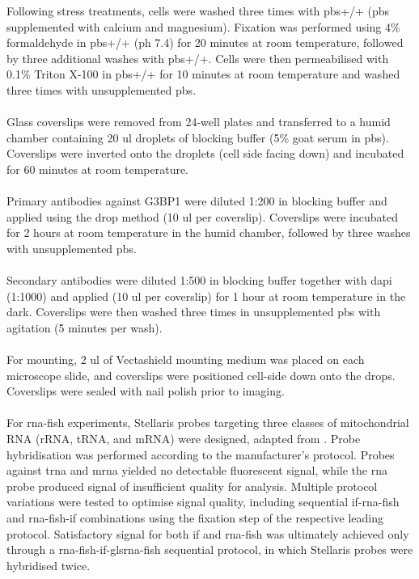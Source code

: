 Following stress treatments, cells were washed three times with \gls{pbs}+/+ (\gls{pbs} supplemented with calcium and magnesium). Fixation was performed using 4\% formaldehyde in \gls{pbs}+/+ (\gls{ph} 7.4) for 20 minutes at room temperature, followed by three additional washes with \gls{pbs}+/+. Cells were then permeabilised with 0.1\% Triton X-100 in \gls{pbs}+/+ for 10 minutes at room temperature and washed three times with unsupplemented \gls{pbs}.
\\
\\
Glass coverslips were removed from 24-well plates and transferred to a humid chamber containing 20 \gls{ul} droplets of blocking buffer (5\% goat serum in \gls{pbs}). Coverslips were inverted onto the droplets (cell side facing down) and incubated for 60 minutes at room temperature.
\\
\\
Primary antibodies against G3BP1 were diluted 1:200 in blocking buffer and applied using the drop method (10 \gls{ul} per coverslip). Coverslips were incubated for 2 hours at room temperature in the humid chamber, followed by three washes with unsupplemented \gls{pbs}.
\\
\\
Secondary antibodies were diluted 1:500 in blocking buffer together with \gls{dapi} (1:1000) and applied (10 \gls{ul} per coverslip) for 1 hour at room temperature in the dark. Coverslips were then washed three times in unsupplemented \gls{pbs} with agitation (5 minutes per wash).
\\
\\
For mounting, 2 \gls{ul} of Vectashield mounting medium was placed on each microscope slide, and coverslips were positioned cell-side down onto the drops. Coverslips were sealed with nail polish prior to imaging.
\\
\\
For \gls{rna}-\gls{fish} experiments, Stellaris probes targeting three classes of mitochondrial RNA (rRNA, tRNA, and mRNA) were designed, adapted from \cite{begeman_spatial_2025}. Probe hybridisation was performed according to the manufacturer's protocol. Probes against \gls{trna} and \gls{mrna} yielded no detectable fluorescent signal, while the \gls{rna} probe produced signal of insufficient quality for analysis. Multiple protocol variations were tested to optimise signal quality, including sequential \gls{if}-\gls{rna}-\gls{fish} and \gls{rna}-\gls{fish}-\gls{if} combinations using the fixation step of the respective leading protocol. Satisfactory signal for both \gls{if} and \gls{rna}-\gls{fish} was ultimately achieved only through a \gls{rna}-\gls{fish}-\gls{if}-gls{rna}-\gls{fish} sequential protocol, in which Stellaris probes were hybridised twice.

